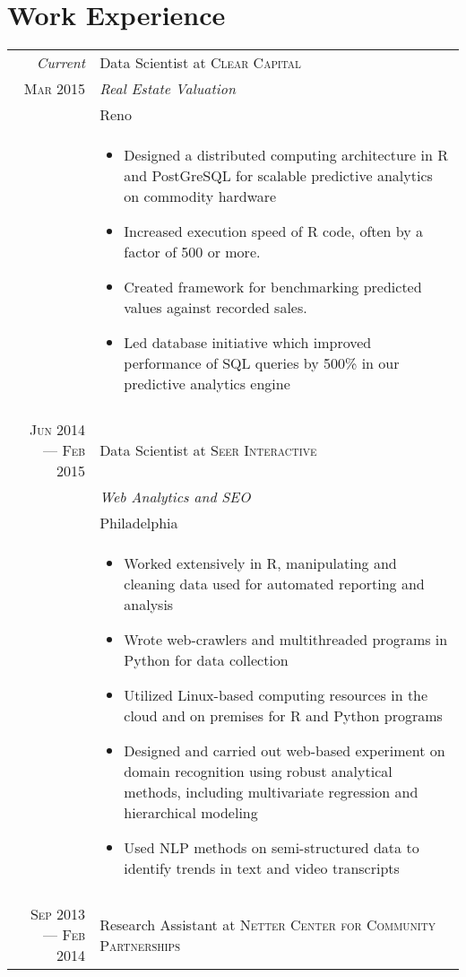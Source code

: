 \documentclass[a4paper,10pt]{article}
\begin{document}
\section{Work Experience}
\begin{tabular}{r|p{11cm}}
 \emph{Current} & Data Scientist at \textsc{Clear Capital} \\ 
 \textsc{Mar 2015}&\emph{Real Estate Valuation}\\ 
 &Reno\\
 &\footnotesize{\begin{itemize}
 		\item{Designed a distributed computing architecture in R and PostGreSQL for scalable predictive analytics on commodity hardware}
 		\item{Increased execution speed of R code, often by a factor of 500 or more.}
 		\item{Created framework for benchmarking predicted values against recorded sales.}
 		\item{Led database initiative which improved performance of SQL queries by 500\% in our predictive analytics engine}
 	\end{itemize}}\\\multicolumn{2}{c}{} \\ 	
 \textsc{Jun 2014 --- Feb 2015} & Data Scientist at \textsc{Seer Interactive} \\
 &\emph{Web Analytics and SEO}\\
 & Philadelphia \\
 &\footnotesize{\begin{itemize}
 		\item{Worked extensively in R, manipulating and cleaning data used for automated reporting and analysis}
 		\item{Wrote web-crawlers and multithreaded programs in Python for data collection}
 		\item{Utilized Linux-based computing resources in the cloud and on premises for R and Python programs}
 		\item{Designed and carried out web-based experiment on domain recognition using robust analytical methods, including multivariate regression and hierarchical modeling}
 		\item{Used NLP methods on semi-structured data to identify trends in text and video transcripts}
 	\end{itemize}}\\\multicolumn{2}{c}{} \\	
 \textsc{Sep 2013 --- Feb 2014} & Research Assistant at \textsc{Netter Center for Community Partnerships}\\

\end{tabular}
\end{document}
